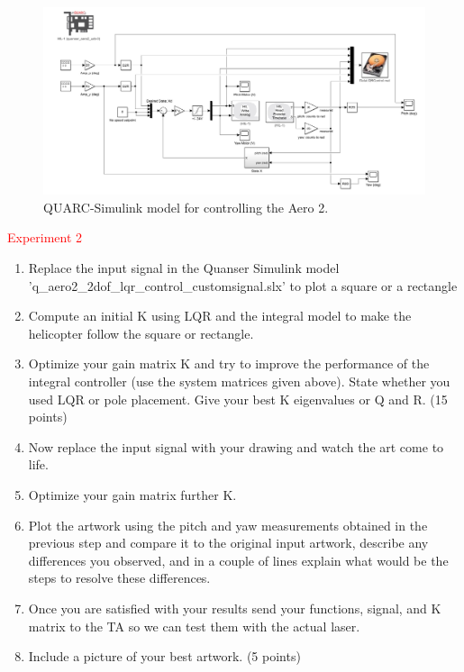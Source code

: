 \documentclass[11pt]{article}
\begin{document}
\begin{figure}[ht!]
  \centering
  \includegraphics[width=5in]{simulink_q.jpg}
  \caption{QUARC-Simulink model for controlling the Aero 2.}
  \label{fig:simulinkq}
\end{figure}


\noindent \textcolor{red}{{\huge  Experiment 2}}
\vspace{0.5 cm}

\begin{enumerate}
    \item Replace the input signal in the Quanser Simulink model 'q\_aero2\_2dof\_lqr\_control\_customsignal.slx' to plot a square or a rectangle

    \item Compute an initial K using LQR and the integral model to make the helicopter follow the square or rectangle.

     \item Optimize your gain matrix K and try to improve the performance of the integral controller (use the system matrices given above).  State whether you used LQR or pole placement. Give your best K eigenvalues or Q and R. (15 points)
    
    \item Now replace the input signal with your drawing and watch the art come to life. 

    \item Optimize your gain matrix further K.    
    
    \item Plot the artwork using the pitch and yaw measurements obtained in the previous step and compare it to the original input artwork, describe any differences you observed, and in a couple of lines explain what would be the steps to resolve these differences.

    \item Once you are satisfied with your results send your functions, signal, and K matrix to the TA so we can test them with the actual laser.
   
    \item Include a picture of your best artwork. (5 points)
\end{enumerate}
\end{document}
